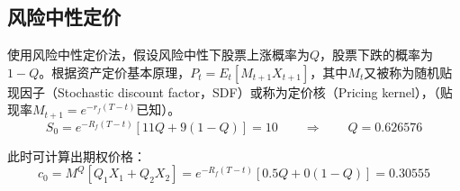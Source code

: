 \documentclass[11pt]{article}
\begin{document}
\subsection{风险中性定价}
使用风险中性定价法，假设风险中性下股票上涨概率为$Q$，股票下跌的概率为$1-Q$。根据资产定价基本原理，$P_t = E_t[M_{t+1}X_{t+1}]$，其中$M_t$又被称为随机贴现因子（Stochastic discount factor，SDF）或称为定价核（Pricing kernel），（贴现率$M_{t+1}=e^{-r_f(T-t)}$已知）。
\begin{equation*}
 S_0 = e^{-R_f(T-t)}[11Q+9(1-Q)] = 10
 \qquad
 \Rightarrow
 \qquad
 Q = 0.626576
\end{equation*}

此时可计算出期权价格：
\begin{equation*}
 c_0 = M^Q[Q_1X_1 + Q_2X_2] = e^{-R_f(T-t)}[0.5Q+0(1-Q)] = 0.30555
\end{equation*}
\end{document}

